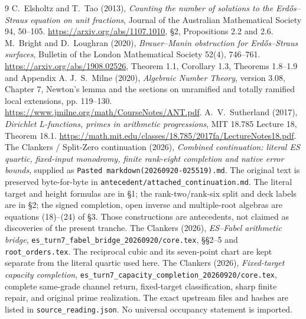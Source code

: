 \begin{thebibliography}{9}
 C.~Elsholtz and T.~Tao (2013),
\emph{Counting the number of solutions to the Erd\H{o}s--Straus equation on unit fractions},
Journal of the Australian Mathematical Society 94, 50--105.
\url{https://arxiv.org/abs/1107.1010}, \S2, Propositions 2.2 and 2.6.
 M.~Bright and D.~Loughran (2020),
\emph{Brauer--Manin obstruction for Erd\H{o}s--Straus surfaces},
Bulletin of the London Mathematical Society 52(4), 746--761.
\url{https://arxiv.org/abs/1908.02526}, Theorem 1.1, Corollary 1.3,
Theorems 1.8--1.9 and Appendix A.
 J.~S.~Milne (2020), \emph{Algebraic Number Theory}, version 3.08,
Chapter 7, Newton's lemma and the sections on unramified and totally ramified
local extensions, pp. 119--130. \url{https://www.jmilne.org/math/CourseNotes/ANT.pdf}.
 A.~V.~Sutherland (2017), \emph{Dirichlet L-functions, primes
in arithmetic progressions}, MIT 18.785 Lecture 18, Theorem 18.1.
\url{https://math.mit.edu/classes/18.785/2017fa/LectureNotes18.pdf}.
 The Clankers / Split-Zero continuation (2026),
\emph{Combined continuation: literal ES quartic, fixed-input monodromy,
finite rank-eight completion and native error bounds}, supplied as
\texttt{Pasted markdown(20260920-025519).md}.
The original text is preserved byte-for-byte in \texttt{antecedent/attached\_continuation.md}.
The literal target and height formulas are in \S1; the rank-two/rank-six split
and deck labels are in \S2; the signed completion, open inverse and multiple-root
algebras are equations (18)--(24) of \S3. Those constructions are antecedents,
not claimed as discoveries of the present tranche.
 The Clankers (2026), \emph{ES--Fabel arithmetic bridge},
\texttt{es\_turn7\_fabel\_bridge\_20260920/core.tex}, \S\S2--5 and
\texttt{root\_orders.tex}. The reciprocal cubic and its seven-point chart are
kept separate from the literal quartic used here.
 The Clankers (2026), \emph{Fixed-target capacity completion},
\texttt{es\_turn7\_capacity\_completion\_20260920/core.tex}, complete same-grade
channel return, fixed-target classification, sharp finite repair, and original
prime realization. The exact upstream files and hashes are listed in
\texttt{source\_reading.json}. No universal occupancy statement is imported.
\end{thebibliography}
